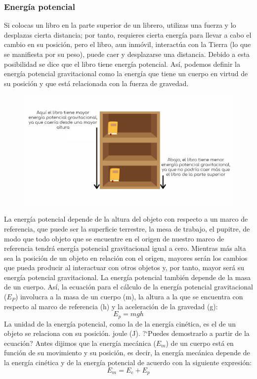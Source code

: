 \documentclass[11pt]{book}
\begin{document}
\subsubsection{Energ\'ia potencial}
Si colocas un libro en la parte superior de un librero, utilizas una fuerza y
lo desplazas cierta distancia; por tanto, requieres cierta energ\'ia para llevar
a cabo el cambio en su posici\'on, pero el libro, aun inm\'ovil, interact\'ua con la
Tierra (lo que se
manifiesta por su peso), puede caer y desplazarse una distancia. Debido a esta
posibilidad se dice que el libro tiene energ\'ia potencial. As\'i, podemos definir
la energ\'ia
potencial gravitacional como la energ\'ia que tiene un cuerpo en virtud de su
posici\'on
y que est\'a relacionada con la fuerza de gravedad.
\begin{figure}[H]
    \centering
    \includegraphics[width=\linewidth]{./Images/Gravitational-potential-energy.png}
\end{figure}%
La energ\'ia potencial depende de la altura del objeto con respecto a un marco de
referencia, que puede ser la superficie terrestre, la mesa de trabajo, el
pupitre,
de modo que todo objeto que se encuentre en el origen de nuestro marco de
referencia tendr\'a energ\'ia potencial gravitacional igual a cero. Mientras m\'as
alta sea la posici\'on de un objeto en relaci\'on con el origen, mayores ser\'an los
cambios que pueda
producir al interactuar con otros objetos y, por tanto, mayor ser\'a su energ\'ia
potencial
gravitacional.
La energ\'ia potencial tambi\'en depende de la masa de un cuerpo. As\'i, la
ecuaci\'on para el c\'alculo de la energ\'ia potencial gravitacional ($E_P$) involucra
a la masa de un cuerpo (m), la altura a la que se encuentra con respecto al
marco de referencia (h) y la aceleraci\'on de la gravedad (g):
\begin{equation*}
    E_p=mgh
\end{equation*}
La unidad de la energ\'ia potencial, como la de la energ\'ia cin\'etica, es el de un
objeto se relaciona con
su posici\'on.
joule (J). ?`Puedes demostrarlo a partir de la ecuaci\'on?
Antes dijimos que la energ\'ia mec\'anica ($E_m$) de un cuerpo est\'a en funci\'on de su
movimiento y su posici\'on, es decir, la energ\'ia mec\'anica depende de la energ\'ia
cin\'etica y de la energ\'ia potencial de acuerdo con la siguiente expresi\'on:
\begin{equation*}
    E_m=E_c+E_p
\end{equation*}
\end{document}
